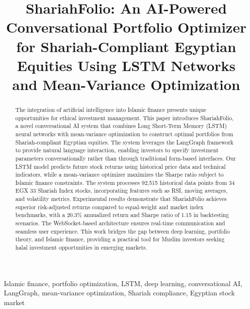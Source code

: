 \documentclass[conference]{IEEEtran}
\begin{document}
\title{ShariahFolio: An AI-Powered Conversational Portfolio Optimizer for Shariah-Compliant Egyptian Equities Using LSTM Networks and Mean-Variance Optimization}

\author{
}

\maketitle

\begin{abstract}
The integration of artificial intelligence into Islamic finance presents unique opportunities for ethical investment management. This paper introduces ShariahFolio, a novel conversational AI system that combines Long Short-Term Memory (LSTM) neural networks with mean-variance optimization to construct optimal portfolios from Shariah-compliant Egyptian equities. The system leverages the LangGraph framework to provide natural language interaction, enabling investors to specify investment parameters conversationally rather than through traditional form-based interfaces. Our LSTM model predicts future stock returns using historical price data and technical indicators, while a mean-variance optimizer maximizes the Sharpe ratio subject to Islamic finance constraints. The system processes 92,515 historical data points from 34 EGX 33 Shariah Index stocks, incorporating features such as RSI, moving averages, and volatility metrics. Experimental results demonstrate that ShariahFolio achieves superior risk-adjusted returns compared to equal-weight and market index benchmarks, with a 20.3\% annualized return and Sharpe ratio of 1.15 in backtesting scenarios. The WebSocket-based architecture ensures real-time communication and seamless user experience. This work bridges the gap between deep learning, portfolio theory, and Islamic finance, providing a practical tool for Muslim investors seeking halal investment opportunities in emerging markets.
\end{abstract}

\begin{IEEEkeywords}
Islamic finance, portfolio optimization, LSTM, deep learning, conversational AI, LangGraph, mean-variance optimization, Shariah compliance, Egyptian stock market
\end{IEEEkeywords}
\end{document}
